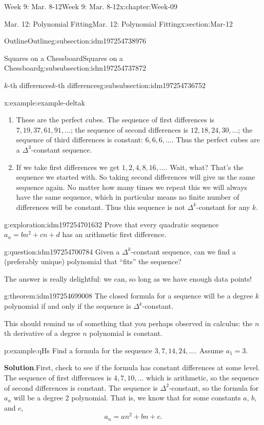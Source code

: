 \documentclass[oneside,10pt,]{book}
\newcommand{\blocktitlefont}{\relax}
\numberwithin{equation}{section}
\begin{document}
\begin{chapterptx}{Week 9: Mar. 8-12}{}{Week 9: Mar. 8-12}{}{}{x:chapter:Week-09}
\begin{sectionptx}{Mar. 12: Polynomial Fitting}{}{Mar. 12: Polynomial Fitting}{}{}{x:section:Mar-12}
\begin{subsectionptx}{Outline}{}{Outline}{}{}{g:subsection:idm197254738976}
\begin{subsubsectionptx}{Squares on a Chessboard}{}{Squares on a Chessboard}{}{}{g:subsubsection:idm197254737872}
\begin{subsubsectionptx}{\(k\)-th differences}{}{\(k\)-th differences}{}{}{g:subsubsection:idm197254736752}
\begin{example}{}{x:example:example-deltak}
\begin{enumerate}
\item{}These are the perfect cubes. The sequence of first differences is \(7, 19, 37, 61, 91, \ldots\); the sequence of second differences is \(12, 18, 24, 30,\ldots\); the sequence of third differences is constant: \(6,6,6,\ldots\). Thus the perfect cubes are a \(\Delta^3\)-constant sequence.%
\item{}If we take first differences we get \(1,2,4,8,16,\ldots\). Wait, what? That's the sequence we started with. So taking second differences will give us the same sequence again. No matter how many times we repeat this we will always have the same sequence, which in particular means no finite number of differences will be constant. Thus this sequence is not \(\Delta^k\)-constant for any \(k\).%
\end{enumerate}
%
\end{example}
\begin{exploration}{}{g:exploration:idm197254701632}%
Prove that every quadratic sequence \(a_n = bn^2 + cn + d\) has an arithmetic first difference.%
\end{exploration}%
\begin{question}{}{g:question:idm197254700784}%
Given a \(\Delta^k\)-constant sequence, can we find a (preferably unique) polynomial that ``fits'' the sequence?%
\end{question}
The answer is really delightful: we can, so long as we have enough data points!%
\begin{theorem}{}{}{g:theorem:idm197254699008}%
The closed formula for a sequence will be a degree \(k\) polynomial if and only if the sequence is \(\Delta^k\)-constant.%
\end{theorem}
This should remind us of something that you perhaps observed in calculus: the \(n\)th derivative of a degree \(n\) polynomial is constant.%
\begin{example}{}{p:example:qHs}%
Find a formula for the sequence \(3, 7, 14, 24,\ldots\). Assume \(a_1 = 3\).%
\par\smallskip%
\noindent\textbf{\blocktitlefont Solution}.\hypertarget{p:solution:byu}{}\quad{}First, check to see if the formula has constant differences at some level. The sequence of first differences is \(4, 7, 10, \ldots\) which is arithmetic, so the sequence of second differences is constant. The sequence is \(\Delta^2\)-constant, so the formula for \(a_n\) will be a degree 2 polynomial. That is, we know that for some constants \(a\), \(b\), and \(c\),%
\begin{equation*}
a_n = an^2 + bn + c\text{.}

\end{equation*}
\end{example}
\end{subsubsectionptx}
\end{subsubsectionptx}
\end{subsectionptx}
\end{sectionptx}
\end{chapterptx}
\end{document}
